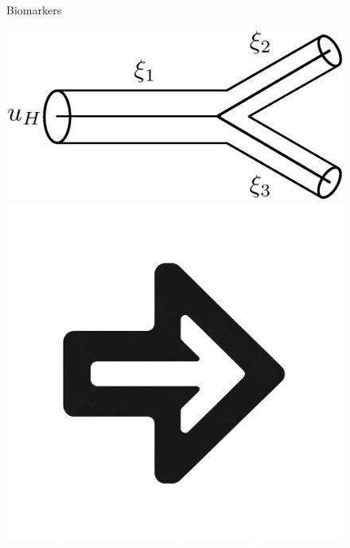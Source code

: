 \documentclass[compress]{beamer}
\begin{document}
\begin{frame}
\begin{figure}[]
\begin{minipage}[t][0.06\paperheight][t]{\linewidth}
			\hfill
			\begin{minipage}{0.1\linewidth}
				\caption*{\tiny}
			\end{minipage}
			\hfill
			\begin{minipage}{0.18\linewidth}
				\caption*{\tiny Biomarkers}
			\end{minipage}
			\hfill
			\begin{minipage}{0.1\linewidth}
				\caption*{\tiny}
			\end{minipage}
		\end{minipage}
			\begin{minipage}[c][0.33\paperheight][c]{\linewidth}
				\begin{minipage}{0.18\linewidth}
					\includegraphics[width=\linewidth]{images/bifurcation.eps}
				\end{minipage}
				\hfill
				\begin{minipage}{0.1\linewidth}
					\includegraphics[width=\linewidth]{images/right_arrow.png}

\end{minipage}
\end{minipage}
\end{figure}
\end{frame}
\end{document}
